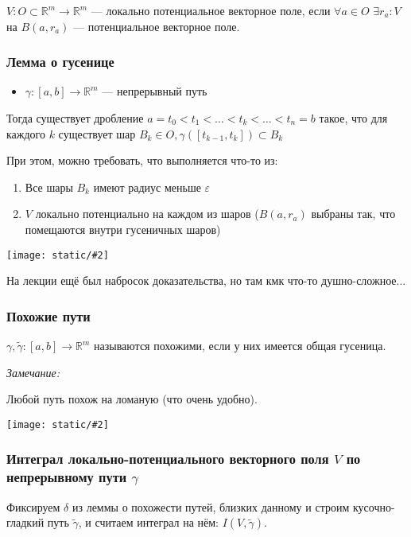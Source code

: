 \documentclass{article}
\def\dbl{\,\,}
\def\images#1#2{\begin{center}\texttt{[image: static/\#2]}\end{center}}
\begin{document}
$V: O \subset \mathbb{R}^m \rightarrow \mathbb{R}^m$ --- локально потенциальное векторное поле, если $\forall a \in O \dbl \exists r_a: V $ на $B(a, r_a)$ --- потенциальное векторное поле.

\subsubsection{Лемма о гусенице}

\begin{itemize}
    \item $\gamma : [a, b] \rightarrow \mathbb{R}^m$ --- непрерывный путь
\end{itemize}

Тогда существует дробление $a = t_0 < t_1 < \ldots < t_k < \ldots < t_n = b$ такое, что для каждого $k$ существует шар $B_k \in O, \gamma([t_{k - 1}, t_k]) \subset B_k$

При этом, можно требовать, что выполняется что-то из:

\begin{enumerate}
    \item Все шары $B_k$ имеют радиус меньше $\varepsilon$
    \item $V$ локально потенциально на каждом из шаров ($B(a, r_a)$ выбраны так, что помещаются внутри гусеничных шаров)
\end{enumerate}

\images{0.5}{gsntsa.jpg}

На лекции ещё был набросок доказательства, но там кмк что-то душно-сложное...

\subsubsection{Похожие пути}

$\gamma, \tilde{\gamma}: [a, b] \rightarrow \mathbb{R}^m$ называются похожими, если у них имеется общая гусеница.

\textit{Замечание:}

Любой путь похож на ломаную (что очень удобно).

\images{0.5}{pohozh_puti.jpg}

\subsubsection{Интеграл локально-потенциального векторного поля $V$ по непрерывному пути $\gamma$}

Фиксируем $\delta$ из леммы о похожести путей, близких данному и строим кусочно-гладкий путь $\tilde{\gamma}$, и считаем интеграл на нём: $I(V, \tilde{\gamma})$.
\end{document}
